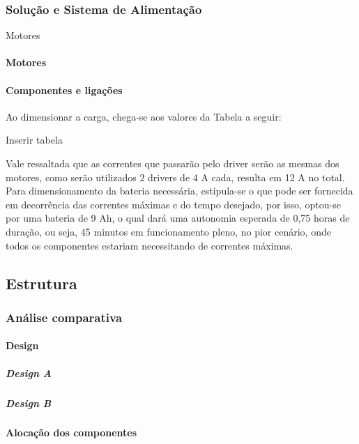\subsubsection{Solução e Sistema de Alimentação}

\subsubitem Motores


\paragraph{Motores}

\paragraph{Componentes e ligações}

Ao dimensionar a carga, chega-se aos valores da Tabela a seguir:

Inserir tabela

Vale ressaltada que as correntes que passarão pelo driver serão as mesmas dos motores, como serão utilizados 2 drivers de 4 A cada, resulta em 12 A no total. Para dimensionamento da bateria necessária, estipula-se o que pode ser fornecida em decorrência das correntes máximas e do tempo desejado, por isso, optou-se por uma bateria de 9 Ah, o qual dará uma autonomia esperada de 0,75 horas de duração, ou seja,  45 minutos em funcionamento pleno, no pior cenário, onde todos os componentes estariam necessitando de correntes máximas.

\subsection{Estrutura}

\subsubsection{Análise comparativa}

\paragraph{Design}

\subparagraph{Design A}

\subparagraph{Design B}

\paragraph{Alocação dos componentes}

